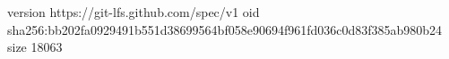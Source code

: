 version https://git-lfs.github.com/spec/v1
oid sha256:bb202fa0929491b551d38699564bf058e90694f961fd036c0d83f385ab980b24
size 18063
